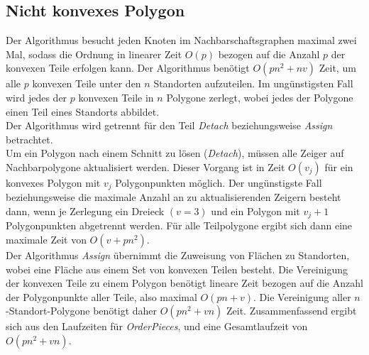 \documentclass[ngerman]{seminarbeitrag}
\begin{document}
\subsection{Nicht konvexes Polygon}
Der Algorithmus \ord besucht jeden Knoten im Nachbarschaftsgraphen maximal zwei Mal, sodass die Ordnung in linearer Zeit $O(p)$ bezogen auf die Anzahl $p$ der konvexen Teile erfolgen kann.
Der Algorithmus \noncon benötigt $O(pn^{2} + nv)$ Zeit, um alle $p$ konvexen Teile unter den $n$ Standorten aufzuteilen. Im ungünstigsten Fall wird jedes der $p$ konvexen Teile in $n$ Polygone zerlegt, wobei jedes der Polygone einen Teil eines Standorts abbildet.\\
Der Algorithmus \daa wird getrennt für den Teil \emph{Detach} beziehungsweise \emph{Assign} betrachtet.\\
Um ein Polygon nach einem Schnitt zu lösen (\emph{Detach}), müssen alle Zeiger auf Nachbarpolygone aktualisiert werden. Dieser Vorgang ist in Zeit $O(v_{j})$ für ein konvexes Polygon mit $v_{j}$ Polygonpunkten möglich. Der ungünstigste Fall beziehungsweise die maximale Anzahl an zu aktualisierenden Zeigern besteht dann, wenn je Zerlegung ein Dreieck $(v=3)$ und ein Polygon mit $v_{j}+1$ Polygonpunkten abgetrennt werden. Für alle Teilpolygone ergibt sich dann eine maximale Zeit von $O(v + pn^{2})$.\\
Der Algorithmus \emph{Assign} übernimmt die Zuweisung von Flächen zu Standorten, wobei eine Fläche aus einem Set von konvexen Teilen besteht. Die Vereinigung der konvexen Teile zu einem Polygon benötigt lineare Zeit bezogen auf die Anzahl der Polygonpunkte aller Teile, also maximal $O(pn + v)$. Die Vereinigung aller $n$-Standort-Polygone benötigt daher $O(pn^{2}+ vn)$ Zeit. 
Zusammenfassend ergibt sich aus den Laufzeiten für \mbox{\textit{OrderPieces}}, \noncon und \daa eine Gesamtlaufzeit von $O(pn^{2} + vn)$.



%
%


\end{document}
